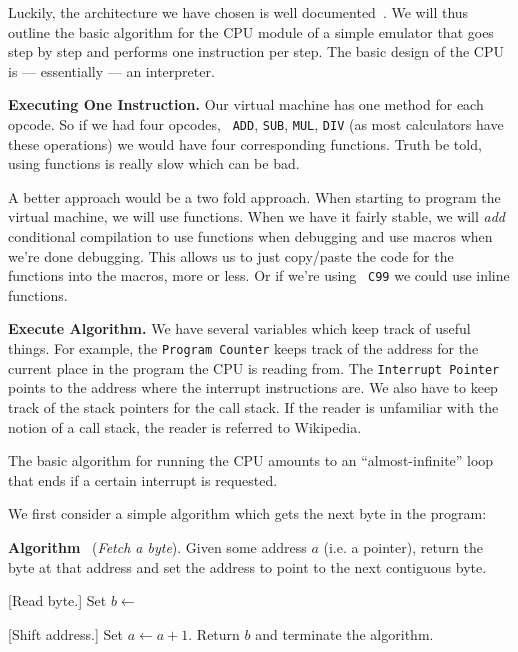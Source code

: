 
Luckily, the architecture we have chosen is well
documented~\cite{knuth2005art}. We will thus outline the basic
algorithm for the CPU module of a simple emulator that goes step
by step and performs one instruction per step. The basic design
of the CPU is --- essentially --- an interpreter. 

\noindent\textbf{Executing One Instruction.} Our virtual machine
has one method for each opcode. So if we had four opcodes, {\tt
  ADD}, {\tt SUB}, {\tt MUL}, {\tt DIV} (as most calculators have
these operations) we would have four corresponding
functions. Truth be told, using functions is really slow which
can be bad.

A better approach would be a two fold approach. When starting to
program the virtual machine, we will use functions. When we have
it fairly stable, we will \emph{add} conditional compilation to
use functions when debugging and use macros when we're done
debugging. This allows us to just copy/paste the code for the
functions into the macros, more or less. Or if we're using {\tt
  C99} we could use inline functions.

\noindent\textbf{Execute Algorithm.} We have several variables
which keep track of useful things. For example, the {\tt Program Counter}
keeps track of the address for the current place in the program
the CPU is reading from. The {\tt Interrupt Pointer} points to
the address where the interrupt instructions are. We also have to
keep track of the stack pointers for the call stack. If the
reader is unfamiliar with the notion of a call stack, the reader
is referred to Wikipedia.

The basic algorithm for running the CPU amounts to an
``almost-infinite'' loop that ends if a certain interrupt is
requested. 

We first consider a simple algorithm which gets the next byte in
the program:

\medskip\noindent{}\textbf{Algorithm
  \thealgorithm}~(\emph{Fetch a byte}). Given some address $a$
(i.e. a pointer), return the byte at that address and set the
address to point to the next contiguous byte.
 
\begin{list}{\textbf{}.}{%
  \setlength{\topsep}{0pt}\setlength{\itemsep}{1pt}\setlength{\parskip}{0pt}\setlength{\parsep}{0pt}}
\item {[Read byte.]} Set $b\gets$ \hyperref[alg:readMemory]{}
\item {[Shift address.]} Set $a\gets a+1$. Return $b$ and
  terminate the algorithm.\lastStep{}
\end{list}\medskip

